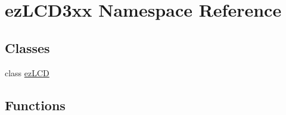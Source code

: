 \hypertarget{namespaceez_l_c_d3xx}{\section{ez\-L\-C\-D3xx Namespace Reference}
\label{namespaceez_l_c_d3xx}
}
\subsection*{Classes}
\begin{DoxyCompactItemize}
\item 
class \hyperlink{classez_l_c_d3xx_1_1ez_l_c_d}{ez\-L\-C\-D}
\end{DoxyCompactItemize}
\subsection*{Functions}
